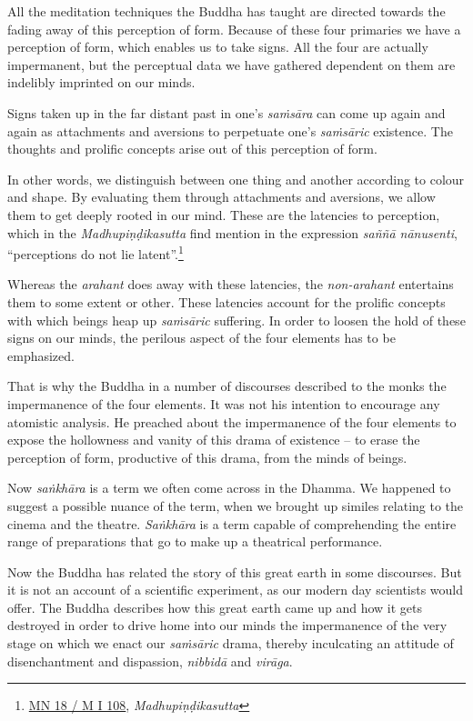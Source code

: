 All the meditation techniques the Buddha has taught are directed towards the fading away of this perception of form. Because of these four primaries we have a perception of form, which enables us to take signs. All the four are actually impermanent, but the perceptual data we have gathered dependent on them are indelibly imprinted on our minds.

Signs taken up in the far distant past in one's \emph{saṁsāra} can come up again and again as attachments and aversions to perpetuate one's \emph{saṁsāric} existence. The thoughts and prolific concepts arise out of this perception of form.

In other words, we distinguish between one thing and another according to colour and shape. By evaluating them through attachments and aversions, we allow them to get deeply rooted in our mind. These are the latencies to perception, which in the \emph{Madhupiṇḍikasutta} find mention in the expression \emph{saññā nānusenti}, ``perceptions do not lie latent''.\footnote{\href{https://suttacentral.net/mn18/pli/ms}{MN 18 / M I 108}, \emph{Madhupiṇḍikasutta}}

Whereas the \emph{arahant} does away with these latencies, the \emph{non-arahant} entertains them to some extent or other. These latencies account for the prolific concepts with which beings heap up \emph{saṁsāric} suffering. In order to loosen the hold of these signs on our minds, the perilous aspect of the four elements has to be emphasized.

\clearpage

That is why the Buddha in a number of discourses described to the monks the impermanence of the four elements. It was not his intention to encourage any atomistic analysis. He preached about the impermanence of the four elements to expose the hollowness and vanity of this drama of existence -- to erase the perception of form, productive of this drama, from the minds of beings.

Now \emph{saṅkhāra} is a term we often come across in the Dhamma. We happened to suggest a possible nuance of the term, when we brought up similes relating to the cinema and the theatre. \emph{Saṅkhāra} is a term capable of comprehending the entire range of preparations that go to make up a theatrical performance.

Now the Buddha has related the story of this great earth in some discourses. But it is not an account of a scientific experiment, as our modern day scientists would offer. The Buddha describes how this great earth came up and how it gets destroyed in order to drive home into our minds the impermanence of the very stage on which we enact our \emph{saṁsāric} drama, thereby inculcating an attitude of disenchantment and dispassion, \emph{nibbidā} and \emph{virāga}.

